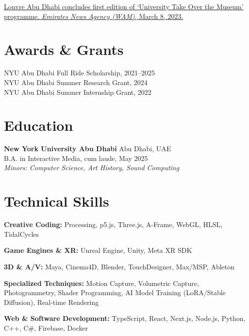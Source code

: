 \documentclass[11pt,a4paper]{article}
\begin{document}
\href{https://www.wam.ae/en/details/1395303137255}{Louvre Abu Dhabi concludes first edition of `University Take Over the Museum' programme. \textit{Emirates News Agency (WAM)}, March 8, 2023.}

\section*{Awards \& Grants}
NYU Abu Dhabi Full Ride Scholarship, 2021--2025 \\
NYU Abu Dhabi Summer Research Grant, 2024 \\
NYU Abu Dhabi Summer Internship Grant, 2022

\section*{Education}
\textbf{New York University Abu Dhabi} \hfill Abu Dhabi, UAE\\
B.A. in Interactive Media, cum laude, May 2025\\
\textit{Minors: Computer Science, Art History, Sound Computing}

\section*{Technical Skills}

\textbf{Creative Coding:} Processing, p5.js, Three.js, A-Frame, WebGL, HLSL, TidalCycles

\textbf{Game Engines \& XR:} Unreal Engine, Unity, Meta XR SDK

\textbf{3D \& A/V:} Maya, Cinema4D, Blender, TouchDesigner, Max/MSP, Ableton

\textbf{Specialized Techniques:} Motion Capture, Volumetric Capture, Photogrammetry, Shader Programming, AI Model Training (LoRA/Stable Diffusion), Real-time Rendering

\textbf{Web \& Software Development:} TypeScript, React, Next.js, Node.js, Python, C++, C\#, Firebase, Docker
\end{document}

